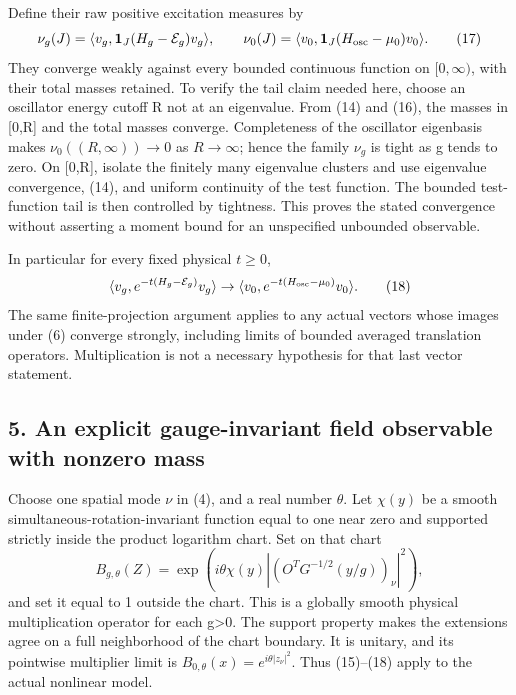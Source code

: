 \documentclass[
  11pt,
]{article}
\begin{document}
Define their raw positive excitation measures by \[
 \nu_g(J)=\langle v_g,\mathbf1_J(H_g-\mathcal E_g)v_g\rangle,
 \qquad
 \nu_0(J)=\langle v_0,\mathbf1_J(H_{\rm osc}-\mu_0)v_0\rangle.
                                                               \tag{17}
\] They converge weakly against every bounded continuous function on
\([0,\infty)\), with their total masses retained. To verify the tail
claim needed here, choose an oscillator energy cutoff R not at an
eigenvalue. From (14) and (16), the masses in {[}0,R{]} and the total
masses converge. Completeness of the oscillator eigenbasis makes
\(\nu_0((R,\infty))\to0\) as \(R\to\infty\); hence the family \(\nu_g\)
is tight as g tends to zero. On {[}0,R{]}, isolate the finitely many
eigenvalue clusters and use eigenvalue convergence, (14), and uniform
continuity of the test function. The bounded test-function tail is then
controlled by tightness. This proves the stated convergence without
asserting a moment bound for an unspecified unbounded observable.

In particular for every fixed physical \(t\ge0\), \[
 \langle v_g,e^{-t(H_g-\mathcal E_g)}v_g\rangle
       \to\langle v_0,e^{-t(H_{\rm osc}-\mu_0)}v_0\rangle.
                                                               \tag{18}
\] The same finite-projection argument applies to any actual vectors
whose images under (6) converge strongly, including limits of bounded
averaged translation operators. Multiplication is not a necessary
hypothesis for that last vector statement.

\subsection{5. An explicit gauge-invariant field observable with nonzero
mass}\label{weak-coupling-part-2-an-explicit-gauge-invariant-field-observable-with-nonzero-mass}

Choose one spatial mode \(\nu\) in (4), and a real number \(\theta\).
Let \(\chi(y)\) be a smooth simultaneous-rotation-invariant function
equal to one near zero and supported strictly inside the product
logarithm chart. Set on that chart \[
 B_{g,\theta}(Z)=\exp\left(i\theta\chi(y)
              |(O^TG^{-1/2}(y/g))_\nu|^2\right),          \tag{19}
\] and set it equal to 1 outside the chart. This is a globally smooth
physical multiplication operator for each g\textgreater0. The support
property makes the extensions agree on a full neighborhood of the chart
boundary. It is unitary, and its pointwise multiplier limit is
\(B_{0,\theta}(x)=e^{i\theta|z_\nu|^2}\). Thus (15)--(18) apply to the
actual nonlinear model.
\end{document}
